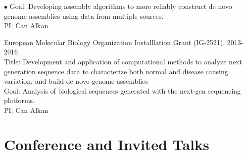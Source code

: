 \documentclass[margin,line]{res}
\newenvironment{list2}{
  \begin{list}{$\bullet$}{%
      \setlength{\itemsep}{0in}
      \setlength{\parsep}{0in} \setlength{\parskip}{0in}
      \setlength{\topsep}{0in} \setlength{\partopsep}{0in} 
      \setlength{\leftmargin}{0.2in}}}{\end{list}}
\begin{document}
\begin{resume}
\begin{list2}
                                         Goal: Developing assembly algorithms to more reliably construct de novo genome assemblies using data from multiple sources.\\
                                         PI: Can Alkan
                                       \item
                                         European Molecular Biology Organization Installlation Grant (IG-2521), 2013-2016 \\
                                         Title: Development and application of computational methods to analyze next generation sequence data to characterize both normal and disease causing variation, and build de novo genome assemblies\\
                                         Goal: Analysis of biological sequences generated with the next-gen sequencing platforms.\\
                                         PI: Can Alkan
                                       \end{list2}
                                       




\vspace*{-.2cm}
\section{\sc Conference and Invited Talks}


\end{resume}
\end{document}
